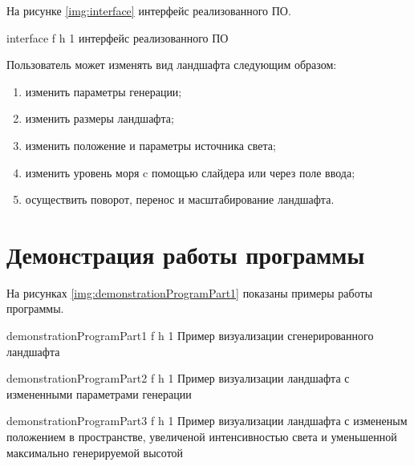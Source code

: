 На рисунке \ref{img:interface} интерфейс реализованного ПО.

{interface} %
{f} %
{h} %
{1\textwidth} %
{интерфейс реализованного ПО} %

Пользователь может изменять вид ландшафта следующим образом:
\begin{enumerate}[label={\arabic*)}]
	 \item изменить параметры генерации;
	 \item изменить размеры ландшафта;
	 \item изменить положение и параметры источника света;
	 \item изменить уровень моря c помощью слайдера или через поле ввода;
	 \item осуществить поворот, перенос и масштабирование ландшафта.
\end{enumerate}

\clearpage

\section{Демонстрация работы программы}

На рисунках \ref{img:demonstrationProgramPart1} показаны примеры работы программы.

{demonstrationProgramPart1} %
{f} %
{h} %
{1\textwidth} %
{Пример визуализации сгенерированного ландшафта} %

{demonstrationProgramPart2} %
{f} %
{h} %
{1\textwidth} %
{Пример визуализации ландшафта с измененными параметрами генерации} %

{demonstrationProgramPart3} %
{f} %
{h} %
{1\textwidth} %
{Пример визуализации ландшафта с измененым положением в пространстве, увеличеной интенсивностью света и уменьшенной максимально генерируемой высотой} %

